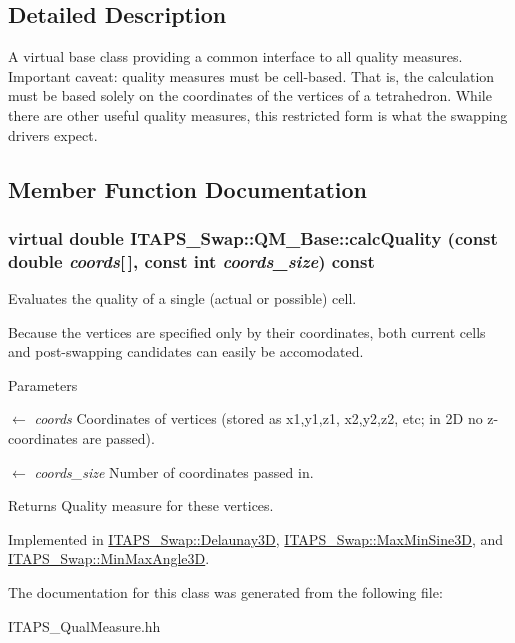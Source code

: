 \subsection{Detailed Description}
A virtual base class providing a common interface to all quality measures. Important caveat: quality measures must be cell-\/based. That is, the calculation must be based solely on the coordinates of the vertices of a tetrahedron. While there are other useful quality measures, this restricted form is what the swapping drivers expect. 

\subsection{Member Function Documentation}
\hypertarget{class_i_t_a_p_s___swap_1_1_q_m___base_aea047b3afc06b75a1115bbaddd8286ee}{
\subsubsection[{calcQuality}]{\setlength{\rightskip}{0pt plus 5cm}virtual double ITAPS\_\-Swap::QM\_\-Base::calcQuality (const double {\em coords}\mbox{[}$\,$\mbox{]}, \/  const int {\em coords\_\-size}) const}}
\label{class_i_t_a_p_s___swap_1_1_q_m___base_aea047b3afc06b75a1115bbaddd8286ee}


Evaluates the quality of a single (actual or possible) cell. 

Because the vertices are specified only by their coordinates, both current cells and post-\/swapping candidates can easily be accomodated.


\begin{DoxyParams}{Parameters}
\item[\mbox{$\leftarrow$} {\em coords}]Coordinates of vertices (stored as x1,y1,z1, x2,y2,z2, etc; in 2D no z-\/coordinates are passed).\item[\mbox{$\leftarrow$} {\em coords\_\-size}]Number of coordinates passed in.\end{DoxyParams}
\begin{DoxyReturn}{Returns}
Quality measure for these vertices. 
\end{DoxyReturn}


Implemented in \hyperlink{class_i_t_a_p_s___swap_1_1_delaunay3_d_a5d045c523425ea05cdc4df77a4df61ce}{ITAPS\_\-Swap::Delaunay3D}, \hyperlink{class_i_t_a_p_s___swap_1_1_max_min_sine3_d_a4856dd6b9712f90d6327f1c651b90471}{ITAPS\_\-Swap::MaxMinSine3D}, and \hyperlink{class_i_t_a_p_s___swap_1_1_min_max_angle3_d_acad0f614af36012501c3aee66c0e85ea}{ITAPS\_\-Swap::MinMaxAngle3D}.



The documentation for this class was generated from the following file:\begin{DoxyCompactItemize}
\item 
ITAPS\_\-QualMeasure.hh\end{DoxyCompactItemize}
